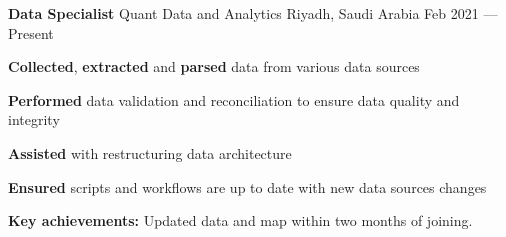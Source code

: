 

\begin{cventries}

  \cventry
    {\textbf{Data Specialist}} %
    {Quant Data and Analytics} %
    {Riyadh, Saudi Arabia} %
    {Feb 2021 — Present} %
    {
      \begin{cvitems} %
        \item {\textbf{Collected}, \textbf{extracted} and \textbf{parsed} data from various data sources}
        \item {\textbf{Performed} data validation and reconciliation to ensure data quality and integrity}
        \item {\textbf{Assisted} with restructuring data architecture}
        \item {\textbf{Ensured} scripts and workflows are up to date with new data sources changes}
        \item {\textbf{Key achievements:} Updated data and map within two months of joining.}
      \end{cvitems}
    }

\end{cventries}
